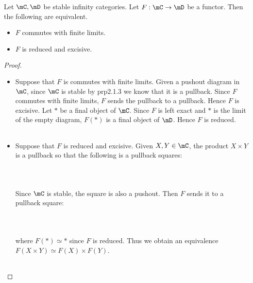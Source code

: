 \documentclass[a4paper]{article}
\begin{document}
\begin{prp}{}{} Let $\mC,\mD$ be stable infinity categories. Let $F:\mC\to\mD$ be a functor. Then the following are equivalent. 
\begin{itemize}
\item $F$ commutes with finite limits. 
\item $F$ is reduced and excisive. 
\end{itemize} \tcbline
\begin{proof}~\\
\begin{itemize}
\item Suppose that $F$ is commutes with finite limits. Given a pushout diagram in $\mC$, since $\mC$ is stable by prp2.1.3 we know that it is a pullback. Since $F$ commutes with finite limits, $F$ sends the pullback to a pullback. Hence $F$ is excisive. Let $\ast$ be a final object of $\mC$. Since $F$ is left exact and $\ast$ is the limit of the empty diagram, $F(\ast)$ is a final object of $\mD$. Hence $F$ is reduced. \\~\\
\item Suppose that $F$ is reduced and excisive. Given $X,Y\in\mC$, the product $X\times Y$ is a pullback so that the following is a pullback squares: \\~\\
\\~\\
Since $\mC$ is stable, the square is also a pushout. Then $F$ sends it to a pullback square: \\~\\
\\~\\
where $F(\ast)\simeq\ast$ since $F$ is reduced. Thus we obtain an equivalence $F(X\times Y)\simeq F(X)\times F(Y)$. \\~\\


\end{itemize}
\end{proof}
\end{prp}
\end{document}
